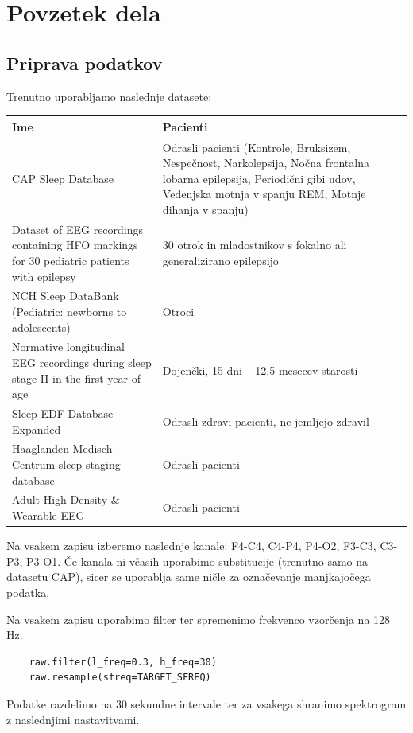 \chapter{Povzetek dela}

\section{Priprava podatkov}
Trenutno uporabljamo naslednje datasete:\\
\begin{tabular}{|p{9cm}|p{6cm}|}
\hline
\textbf{Ime} & \textbf{Pacienti} \\
\hline
CAP Sleep Database & Odrasli pacienti (Kontrole, Bruksizem, Nespečnost, Narkolepsija, Nočna frontalna lobarna epilepsija, Periodični gibi udov, Vedenjska motnja v spanju REM, Motnje dihanja v spanju) \\
\hline
Dataset of EEG recordings containing HFO markings for 30 pediatric patients with epilepsy & 30 otrok in mladostnikov s fokalno ali generalizirano epilepsijo \\
\hline
NCH Sleep DataBank (Pediatric: newborns to adolescents) & Otroci \\
\hline
Normative longitudinal EEG recordings during sleep stage II in the first year of age & Dojenčki, 15 dni – 12.5 mesecev starosti \\
\hline
Sleep-EDF Database Expanded & Odrasli zdravi pacienti, ne jemljejo zdravil \\
\hline
Haaglanden Medisch Centrum sleep staging database & Odrasli pacienti \\
\hline
Adult High-Density \& Wearable EEG & Odrasli pacienti \\
\hline
\end{tabular}

Na vsakem zapisu izberemo naslednje kanale: F4-C4, C4-P4, P4-O2, F3-C3, C3-P3, P3-O1.
Če kanala ni včasih uporabimo substitucije (trenutno samo na datasetu CAP), sicer se uporablja same ničle za označevanje manjkajočega podatka.

Na vsakem zapisu uporabimo filter ter spremenimo frekvenco vzorčenja na 128 Hz.
\begin{verbatim}
    raw.filter(l_freq=0.3, h_freq=30)
    raw.resample(sfreq=TARGET_SFREQ)
\end{verbatim}

Podatke razdelimo na 30 sekundne intervale ter za vsakega shranimo spektrogram z naslednjimi nastavitvami.

